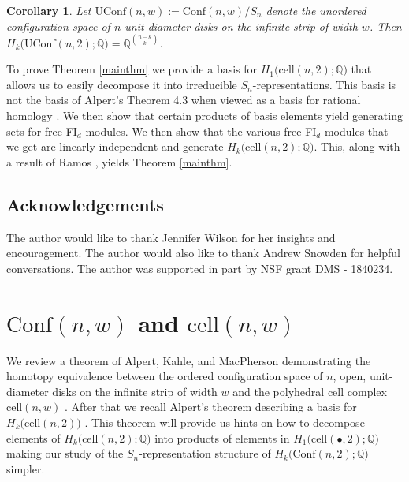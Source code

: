 \documentclass[12py]{amsart}%
\newtheorem{cor}[thm]{Corollary}
\theoremstyle{definition}\newtheorem{definition}[thm]{Definition}
\theoremstyle{definition}
\newcommand{\Q}{\ensuremath{\mathbb{Q}}}
\begin{document}
\begin{cor}\label{UnorderCor}
Let $\text{UConf}(n,w):=\text{Conf}(n,w)/S_{n}$ denote the unordered configuration space of $n$ unit-diameter disks on the infinite strip of width $w$. Then $H_{k}\big(\text{UConf}(n,2);\Q\big)=\Q^{\binom{n-k}{k}}$.
\end{cor}

To prove Theorem \ref{mainthm} we provide a basis for $H_{1}\big(\text{cell}(n,2);\Q\big)$ that allows us to easily decompose it into irreducible $S_{n}$-representations. This basis is not the basis of Alpert's Theorem 4.3 when viewed as a basis for rational homology \cite[Theorem 4.3]{alpert2020generalized}. We then show that certain products of basis elements yield generating sets for free FI$_{d}$-modules. We then show that the various free FI$_{d}$-modules that we get are linearly independent and generate $H_{k}\big(\text{cell}(n,2);\Q\big)$. This, along with a result of Ramos \cite[Proposition 3.4]{ramos2017generalized}, yields Theorem \ref{mainthm}.

\subsection{Acknowledgements}
The author would like to thank Jennifer Wilson for her insights and encouragement. The author would also like to thank Andrew Snowden for helpful conversations. The author was supported in part by NSF grant DMS - 1840234.

\section{$\text{Conf}(n,w)$ and $\text{cell}(n,w)$}

We review a theorem of Alpert, Kahle, and MacPherson demonstrating the homotopy equivalence between the ordered configuration space of $n$, open, unit-diameter disks on the infinite strip of width $w$ and the polyhedral cell complex $\text{cell}(n,w)$ \cite[Theorem 3.1]{alpert2021configuration}. After that we recall Alpert's theorem describing a basis for $H_{k}\big(\text{cell}(n,2)\big)$ \cite[Theorem 4.3]{alpert2020generalized}. This theorem will provide us hints on how to decompose elements of $H_{k}\big(\text{cell}(n,2);\Q\big)$ into products of elements in $H_{1}\big(\text{cell}(\bullet,2);\Q\big)$ making our study of the $S_{n}$-representation structure of $H_{k}\big(\text{Conf}(n,2);\Q\big)$ simpler.
\end{document}
